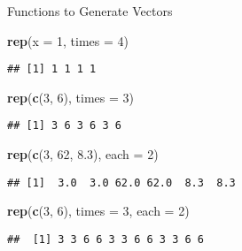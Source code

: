 \documentclass[ignorenonframetext,]{beamer}
\newenvironment{Shaded}{\begin{snugshade}}{\end{snugshade}}
\newcommand{\DataTypeTok}[1]{\textcolor[rgb]{0.13,0.29,0.53}{#1}}
\newcommand{\DecValTok}[1]{\textcolor[rgb]{0.00,0.00,0.81}{#1}}
\newcommand{\FloatTok}[1]{\textcolor[rgb]{0.00,0.00,0.81}{#1}}
\newcommand{\KeywordTok}[1]{\textcolor[rgb]{0.13,0.29,0.53}{\textbf{#1}}}
\newcommand{\NormalTok}[1]{#1}
\begin{document}
\begin{frame}[fragile]{Functions to Generate Vectors}
\protect\hypertarget{functions-to-generate-vectors-1}{}

\begin{Shaded}
\begin{Highlighting}[]
\KeywordTok{rep}\NormalTok{(}\DataTypeTok{x =} \DecValTok{1}\NormalTok{, }\DataTypeTok{times =} \DecValTok{4}\NormalTok{)}
\end{Highlighting}
\end{Shaded}

\begin{verbatim}
## [1] 1 1 1 1
\end{verbatim}

\begin{Shaded}
\begin{Highlighting}[]
\KeywordTok{rep}\NormalTok{(}\KeywordTok{c}\NormalTok{(}\DecValTok{3}\NormalTok{, }\DecValTok{6}\NormalTok{), }\DataTypeTok{times =} \DecValTok{3}\NormalTok{)}
\end{Highlighting}
\end{Shaded}

\begin{verbatim}
## [1] 3 6 3 6 3 6
\end{verbatim}

\begin{Shaded}
\begin{Highlighting}[]
\KeywordTok{rep}\NormalTok{(}\KeywordTok{c}\NormalTok{(}\DecValTok{3}\NormalTok{, }\DecValTok{62}\NormalTok{, }\FloatTok{8.3}\NormalTok{), }\DataTypeTok{each =} \DecValTok{2}\NormalTok{)}
\end{Highlighting}
\end{Shaded}

\begin{verbatim}
## [1]  3.0  3.0 62.0 62.0  8.3  8.3
\end{verbatim}

\begin{Shaded}
\begin{Highlighting}[]
\KeywordTok{rep}\NormalTok{(}\KeywordTok{c}\NormalTok{(}\DecValTok{3}\NormalTok{, }\DecValTok{6}\NormalTok{), }\DataTypeTok{times =} \DecValTok{3}\NormalTok{, }\DataTypeTok{each =} \DecValTok{2}\NormalTok{)}
\end{Highlighting}
\end{Shaded}

\begin{verbatim}
##  [1] 3 3 6 6 3 3 6 6 3 3 6 6
\end{verbatim}

\end{frame}
\end{document}
